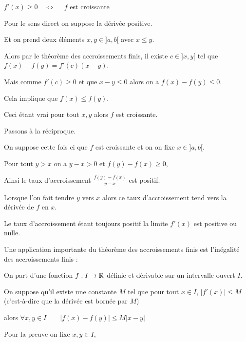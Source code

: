$f'(x) \ge 0 \quad \iff \quad$ $f$ est croissante 

\change

Pour le sens direct on suppose la dérivée positive.

Et on prend deux éléments $x,y \in ]a,b[$ avec $x\le y$. 

\change

Alors par le théorème des accroissements finis, il existe $c\in]x,y[$ tel que
$f(x)-f(y) = f'(c) (x-y)$. 

\change

Mais comme $f'(c) \ge 0$ et que $x-y \le 0$ alors on a $f(x)-f(y) \le 0$.

\change

Cela implique que $f(x) \le f(y)$. 

Ceci étant vrai pour tout $x,y$ alors $f$ est croissante.

\change

Passons à la réciproque.

On suppose cette fois ci que  $f$ est croissante et on on fixe $x\in]a,b[$.

\change

Pour tout $y > x$ on a $y-x>0$ et $f(y)-f(x)\ge 0$, 

\change


Ainsi le taux d'accroissement $\frac{f(y)-f(x)}{y-x}$ est positif. 


\change

Lorsque l'on fait tendre $y$ vers $x$  
alors ce taux d'accroissement 
tend vers la dérivée de $f$ en $x$.

Le taux d'accroissement étant toujours positif la limite $f'(x)$ est positive ou nulle.


\diapo

Une application importante du théorème des accroissements finis est l'inégalité des accroissements finis :

On part d'une fonction $f : I \to \mathbb{R}$ définie et dérivable sur un intervalle ouvert $I$.

On suppose qu'il existe une constante $M$ tel que pour tout 
$x \in I$, $\big|f'(x)\big| \le M$ (c'est-à-dire que la dérivée est bornée par $M$)



alors
$\forall x,y \in I \qquad \big| f(x)-f(y) \big| \le M |x-y|$

\change

Pour la preuve on fixe $x,y \in I$, 

